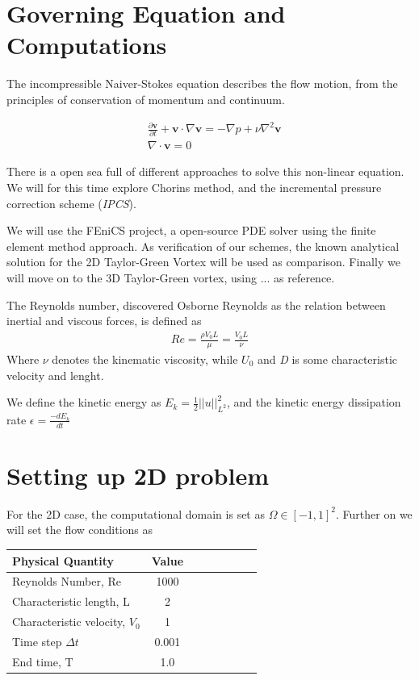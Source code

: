 \documentclass[a4paper,norsk]{article}
\begin{document}
\section*{Governing Equation and Computations}
The incompressible Naiver-Stokes equation describes the flow motion, from the principles of conservation of momentum
and continuum.

\begin{align}
&\frac{\partial \textbf{v}}{\partial t} + \textbf{v} \cdot \nabla \textbf{v} =
-\nabla p + \nu \nabla^2 \textbf{v} \\
&\nabla \cdot \textbf{v} = 0
\end{align}

There is a open sea full of different approaches to solve this non-linear equation. We will for this
time explore Chorins method, and the incremental pressure correction scheme (\textit{IPCS}).

We will use the FEniCS project, a open-source PDE solver using the finite element method approach.
As verification of our schemes, the known analytical solution for the 2D Taylor-Green Vortex will be used as comparison.
Finally we will move on to the 3D Taylor-Green vortex, using ... as reference. 

The Reynolds number, discovered Osborne Reynolds as the relation between inertial and viscous forces, is defined
as
\begin{align}
Re = \frac{\rho V_{0} L}{\mu} = \frac{V_{0} L}{\nu}
\end{align}
Where $\nu$ denotes the kinematic viscosity, while $U_{0}$ and \textit{D} is some characteristic velocity and lenght.

We define the kinetic energy as $E_k = \frac{1}{2}||u||^2_{L^2}$, and the kinetic energy dissipation rate $\epsilon = \frac{-d E_k}{dt}$

\section*{Setting up 2D problem}

For the 2D case, the computational domain is set as $\Omega \in [-1, 1]^2$. Further on we will set
the flow conditions as \\

\begin{tabular}{l*{6}{c}r}
Physical Quantity              & Value  \\
\hline
Reynolds Number, Re & 1000   \\
Characteristic length, L           & 2     \\
Characteristic velocity, $V_{0}$   & 1     \\
Time step $\Delta t$ 			   & 0.001 \\
End time, T 					   & 1.0
\end{tabular}
\end{document}
